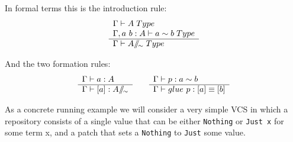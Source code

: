 In formal terms this is the introduction rule:
\begin{equation}
  \label{eq:coequalizer-intro}
  \begin{array}[t]{l}
    \Gamma \vdash A \; Type\\
    \Gamma, a~b : A \vdash a \sim b \; Type\\
    \hline
    \Gamma \vdash A /\!\!/\!_{\sim} \; Type\\
  \end{array}
\end{equation}

And the two formation rules:
\begin{equation}
  \begin{centering}
  \label{eq:coequalizer-formation}
  \begin{array}[t]{l}
    \Gamma \vdash a : A\\
    \hline
    \Gamma \vdash [a] : A \quot{\sim}\\
  \end{array}
  \qquad
  \begin{array}[t]{l}
    \Gamma \vdash p : a \sim b\\
    \hline
    \Gamma \vdash glue~p : [a] \equiv [b]
  \end{array}
  \end{centering}
\end{equation}

As a concrete running example we will consider a very simple VCS in which a
repository consists of a single value that can be either \texttt{Nothing} or
\texttt{Just x} for some term x, and a patch that sets a \texttt{Nothing} to
\texttt{Just} some value.

